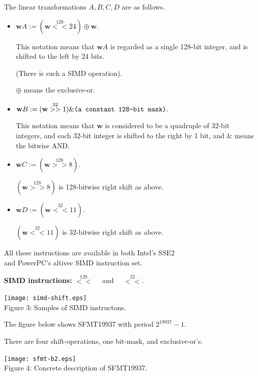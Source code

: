 \documentclass[a4j,12pt,landscape]{jarticle}
\def\bw{{{\mathbf w}}}
\begin{document}
The linear transformations $A,B,C,D$ are as follows.
\begin{itemize}
\item 
$\bw A := (\bw \stackrel{128}{<<} 24) \oplus \bw.$

This notation means that $\bw A$ is regarded
as a single 128-bit integer, and 
is shifted to the left by 24 bits.

(There is such a SIMD operation).

$\oplus$ means the exclusive-or.

\item
$\bw B := (\bw \stackrel{32}{>>} 1) \& \mbox{\tt (a constant 128-bit mask)}.$

This notation means that $\bw$ is considered to be 
a quadruple of $32$-bit integers, and
each $32$-bit integer is shifted to the right by 1 bit,
and $\&$ means the bitwise AND. 

\newpage

\item 
$\bw C := (\bw \stackrel{128}{>>} 8).$

$(\bw \stackrel{128}{>>} 8)$ is 128-bitwise right shift as above.

\item
$\bw D := (\bw \stackrel{32}{<<} 11).$

$(\bw \stackrel{32}{<<} 11)$ is 32-bitwise right shift as above.

\end{itemize}
All these instructions are available in 
both Intel's SSE2 \\
and PowerPC's altivec SIMD instruction set.

\newpage
{\bf SIMD instructions:} 
$\stackrel{128}{<<}\quad$ and $\quad\stackrel{32}{<<}$.
\begin{center}
\texttt{[image: simd-shift.eps]}
\\
Figure 3: Samples of SIMD instructons.
\end{center}

\newpage
The figure below shows SFMT19937 with period $2^{19937}-1$.

There are four shift-operations, one bit-mask, and exclusive-or's.

\begin{center}
\texttt{[image: sfmt-b2.eps]}
\\
Figure 4: Concrete description of SFMT19937.
\end{center}
\end{document}

